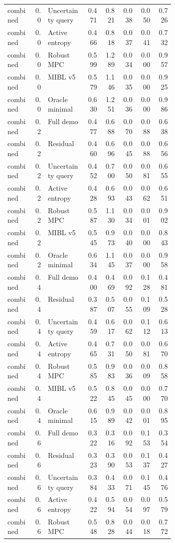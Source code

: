 \documentclass{article}
\begin{document}
\begin{center}
\begin{longtable}{p{0.16\linewidth}rp{0.23\linewidth}rrrrr}
combined & 0.0 & Uncertainty query & 0.471 & 0.821 & 0.038 & 0.050 & 0.726\\
combined & 0.0 & Active entropy & 0.466 & 0.818 & 0.037 & 0.041 & 0.732\\
combined & 0.0 & Robust MPC & 0.599 & 1.289 & 0.034 & 0.000 & 0.957\\
combined & 0.0 & MIBL v5 & 0.579 & 1.146 & 0.035 & 0.000 & 0.925\\
combined & 0.0 & Oracle minimal & 0.630 & 1.251 & 0.036 & 0.000 & 0.986\\
combined & 0.2 & Full demo & 0.477 & 0.688 & 0.070 & 0.088 & 0.638\\
combined & 0.2 & Residual & 0.460 & 0.696 & 0.045 & 0.088 & 0.656\\
combined & 0.2 & Uncertainty query & 0.452 & 0.700 & 0.050 & 0.081 & 0.655\\
combined & 0.2 & Active entropy & 0.428 & 0.693 & 0.043 & 0.062 & 0.651\\
combined & 0.2 & Robust MPC & 0.587 & 1.130 & 0.034 & 0.001 & 0.902\\
combined & 0.2 & MIBL v5 & 0.545 & 0.973 & 0.040 & 0.000 & 0.843\\
combined & 0.2 & Oracle minimal & 0.634 & 1.145 & 0.037 & 0.000 & 0.958\\
combined & 0.4 & Full demo & 0.400 & 0.469 & 0.092 & 0.128 & 0.481\\
combined & 0.4 & Residual & 0.387 & 0.507 & 0.055 & 0.109 & 0.528\\
combined & 0.4 & Uncertainty query & 0.459 & 0.617 & 0.062 & 0.112 & 0.613\\
combined & 0.4 & Active entropy & 0.465 & 0.731 & 0.050 & 0.081 & 0.670\\
combined & 0.4 & Robust MPC & 0.585 & 0.983 & 0.036 & 0.009 & 0.858\\
combined & 0.4 & MIBL v5 & 0.522 & 0.845 & 0.045 & 0.000 & 0.770\\
combined & 0.4 & Oracle minimal & 0.615 & 0.989 & 0.042 & 0.001 & 0.895\\
combined & 0.6 & Full demo & 0.322 & 0.316 & 0.092 & 0.153 & 0.354\\
combined & 0.6 & Residual & 0.323 & 0.390 & 0.053 & 0.137 & 0.427\\
combined & 0.6 & Uncertainty query & 0.384 & 0.433 & 0.071 & 0.145 & 0.476\\
combined & 0.6 & Active entropy & 0.422 & 0.594 & 0.054 & 0.097 & 0.579\\
combined & 0.6 & Robust MPC & 0.548 & 0.828 & 0.044 & 0.018 & 0.772\\

\end{longtable}
\end{center}
\end{document}
